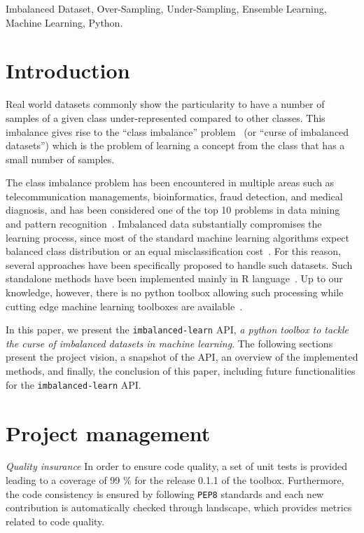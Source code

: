 \documentclass[twoside,11pt]{article}
\begin{document}
\begin{keywords}
Imbalanced Dataset, Over-Sampling, Under-Sampling, Ensemble Learning, Machine Learning, Python.
\end{keywords}

\section{Introduction}

Real world datasets commonly show the particularity to have a number of samples of a given class under-represented compared to other classes.
This imbalance gives rise to the ``class imbalance'' problem~\citep{prati2009data} (or ``curse of imbalanced datasets'')
which is the problem of learning a concept from the class that has a small number of samples.

The class imbalance problem has been encountered in multiple areas such as 
telecommunication managements, bioinformatics, fraud detection, and medical diagnosis,
and has been considered one of the top 10 problems in data mining and 
pattern recognition~\citep{yang200610,rastgoo2016tackling}. 
Imbalanced data substantially compromises the learning process, since most of the 
standard machine learning algorithms expect balanced class distribution or an 
equal misclassification cost~\citep{he2009learning}. For this reason, several
approaches have been specifically proposed to handle such datasets.
Such standalone methods have been implemented mainly in R language~\citep{torgo2010data,kuhn2015caret,dal2013racing}.
Up to our knowledge, however, there is no python toolbox allowing such processing while cutting edge machine learning toolboxes are available~\citep{pedregosa2011scikit,sonnenburg2010shogun}.

In this paper, we present the \texttt{imbalanced-learn} API, 
\textit{a python toolbox to tackle the curse of imbalanced datasets
in machine learning}. The following sections present the project vision, a snapshot of the API, an overview of the implemented methods,
and finally, the conclusion of this paper, including future functionalities
for the \texttt{imbalanced-learn} API.

\section{Project management}

\noindent\textit{Quality insurance} In order to ensure code quality, a set of unit tests is provided leading to a coverage of 99 \% for the release 0.1.1 of the toolbox.
Furthermore, the code consistency is ensured by following \texttt{PEP8} standards and each new contribution is automatically checked through landscape, which provides metrics related to code quality.
\end{document}
